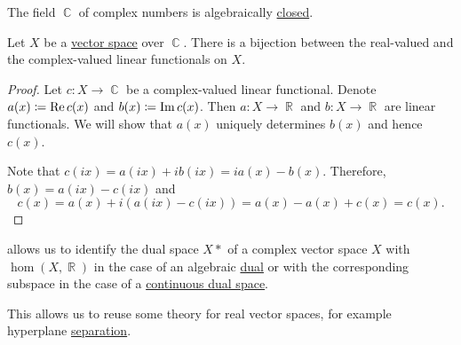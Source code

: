 \begin{definition}\label{def:complex_absolute_value}
\end{definition}

\begin{theorem}\label{thm:fundamental_theorem_of_algebra}
  The field \( \BbbC \) of complex numbers is algebraically \hyperref[def:algebraically_closed_field]{closed}.
\end{theorem}

\begin{theorem}\label{thm:linear_functionals_over_c}
  Let \( X \) be a \hyperref[def:vector_space]{vector space} over \( \BbbC \). There is a bijection between the real-valued and the complex-valued linear functionals on \( X \).
\end{theorem}
\begin{proof}
  Let \( c: X \to \BbbC \) be a complex-valued linear functional. Denote \( a(x) \coloneqq \operatorname{Re} c(x) \) and \( b(x) \coloneqq \operatorname{Im} c(x) \). Then \( a: X \to \BbbR \) and \( b: X \to \BbbR \) are linear functionals. We will show that \( a(x) \) uniquely determines \( b(x) \) and hence \( c(x) \).

  Note that \( c(ix) = a(ix) + i b(ix) = i a(x) - b(x) \). Therefore, \( b(x) = a(ix) - c(ix) \) and
  \begin{equation*}
    c(x) = a(x) + i (a(ix) - c(ix)) = a(x) - a(x) + c(x) = c(x).
  \end{equation*}
\end{proof}

\begin{remark}\label{rem:linear_functionals_over_c}
   allows us to identify the dual space \( X* \) of a complex vector space \( X \) with \( \hom(X, \BbbR) \) in the case of an algebraic \hyperref[def:dual_vector_space]{dual} or with the corresponding subspace in the case of a \hyperref[def:continuous_dual_space]{continuous dual space}.

  This allows us to reuse some theory for real vector spaces, for example hyperplane \hyperref[def:hyperplane_separation]{separation}.
\end{remark}

